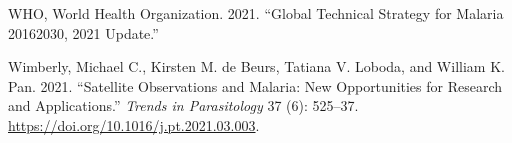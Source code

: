 \documentclass[
  letterpaper,
  DIV=11,
  numbers=noendperiod]{scrreprt}
\newlength{\cslhangindent}
\newlength{\cslentryspacingunit} %
\newenvironment{CSLReferences}[2] %
 {%
  \setlength{\parindent}{0pt}
  \ifodd #1
  \let\oldpar\par
  \def\par{\hangindent=\cslhangindent\oldpar}
  \fi
  \setlength{\parskip}{#2\cslentryspacingunit}
 }%
 {}
\begin{document}
\begin{CSLReferences}{1}{0}
\leavevmode{}%
WHO, World Health Organization. 2021. {``Global Technical Strategy for
Malaria 2016{\textendash}2030, 2021 Update.''}

\leavevmode{}%
Wimberly, Michael C., Kirsten M. de Beurs, Tatiana V. Loboda, and
William K. Pan. 2021. {``Satellite Observations and Malaria: New
Opportunities for Research and Applications.''} \emph{Trends in
Parasitology} 37 (6): 525--37.
\url{https://doi.org/10.1016/j.pt.2021.03.003}.

\end{CSLReferences}
\end{document}
